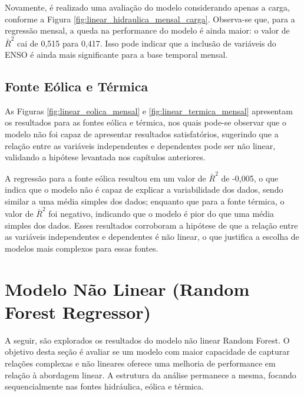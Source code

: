 Novamente, é realizado uma avaliação do modelo considerando apenas a carga, conforme a Figura 
\ref{fig:linear_hidraulica_mensal_carga}. Observa-se que, para a regressão mensal, a queda na performance do modelo é ainda
maior: o valor de $\bar{R}^2$ cai de 0,515 para 0,417. Isso pode indicar que a inclusão de variáveis do ENSO é ainda mais significante 
para a base temporal mensal.

\subsection{Fonte Eólica e Térmica}
As Figuras \ref{fig:linear_eolica_mensal} e \ref{fig:linear_termica_mensal} apresentam os resultados para as fontes eólica 
e térmica, nos quais pode-se observar que o modelo não foi capaz de apresentar resultados satisfatórios, sugerindo
que a relação entre as variáveis independentes e dependentes pode ser não linear, validando a hipótese levantada nos capítulos
anteriores.

\begin{figure}[!ht]
  {}
  {}
\end{figure}
\begin{figure}[!ht]
  {}
  {}
\end{figure}

A regressão para a fonte eólica resultou em um valor de $\bar{R}^2$ de -0,005, o que indica que o modelo não é capaz de explicar a 
variabilidade dos dados, sendo similar a uma média simples dos dados; enquanto que para a fonte térmica, o valor de $\bar{R}^2$ foi negativo, 
indicando que o modelo é pior do que uma média simples dos dados. Esses resultados corroboram a hipótese de que a relação entre as 
variáveis independentes e dependentes é não linear, o que justifica a escolha de modelos mais complexos para essas fontes.


\section{Modelo Não Linear (Random Forest Regressor)}
A seguir, são explorados os resultados do modelo não linear Random Forest. O objetivo desta seção é avaliar se um modelo com maior 
capacidade de capturar relações complexas e não lineares oferece uma melhoria de performance em relação à abordagem linear. A estrutura 
da análise permanece a mesma, focando sequencialmente nas fontes hidráulica, eólica e térmica.
